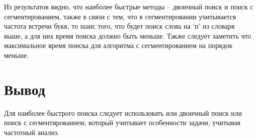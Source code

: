 Из результатов видно, что наиболее быстрые методы -- двоичный поиск и поиск с сегментированием, также в связи с тем, что в сегментировании учитывается частота встречи букв, то шанс того, что будет поиск слова на 'п' из словаря выше, а для них время поиска должно быть меньше. Также следует заметить что максимальное время поиска для алгоритма с сегментированием на порядок меньше.

\section{Вывод} 
Для наиболее быстрого поиска следует использовать или двоичный поиск или поиск с сегментированием, который учитывает особенности задачи, учитывая частотный анализ.
